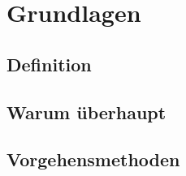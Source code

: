 \section{Grundlagen}

\subsection{Definition}
\vfill

\subsection{Warum überhaupt}
\vfill

\subsection{Vorgehensmethoden}